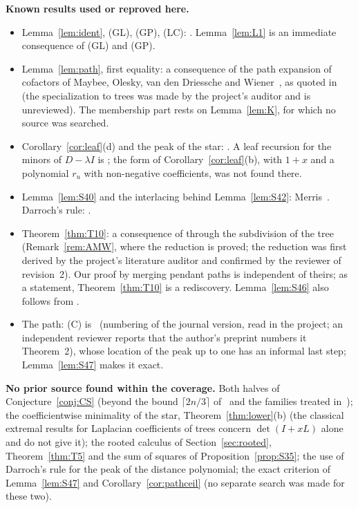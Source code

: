 \documentclass[11pt]{amsart}
\theoremstyle{definition}
\theoremstyle{remark}
\begin{document}
\smallskip
\noindent\textbf{Known results used or reproved here.}
\begin{itemize}
\item Lemma~\ref{lem:ident}, (GL), (GP), (LC): \cite{GL78,GP71,AAB}.
Lemma~\ref{lem:L1} is an immediate consequence of (GL) and (GP).
\item Lemma~\ref{lem:path}, first equality: a consequence of the path
expansion of cofactors of Maybee, Olesky, van den Driessche and
Wiener~\cite{MOvdDW}, as quoted in~\cite[eq.~(4)]{CS06} (the specialization to
trees was made by the project's auditor and is unreviewed). The membership
part rests on Lemma~\ref{lem:K}, for which no source was searched.
\item Corollary~\ref{cor:leaf}(d) and the peak of the star: \cite[Theorem~1]{Col89}.
A leaf recursion for the minors of $D-\lambda I$ is
\cite[Theorem~4]{Col86}; the form of Corollary~\ref{cor:leaf}(b), with
$1+x$ and a polynomial $r_u$ with non-negative coefficients, was not found
there.
\item Lemma~\ref{lem:S40} and the interlacing behind Lemma~\ref{lem:S42}:
Merris~\cite{Mer90}. Darroch's rule: \cite{Dar64,Pit97}.
\item Theorem~\ref{thm:T10}: a consequence of \cite[Theorem~4.4 with
Lemma~4.2]{AMW} through the subdivision of the tree (Remark~\ref{rem:AMW},
where the reduction is proved; the reduction was first derived by the
project's literature auditor and confirmed by the reviewer of revision~2).
Our proof by merging pendant paths is independent of theirs; as a statement,
Theorem~\ref{thm:T10} is a rediscovery. Lemma~\ref{lem:S46} also follows
from \cite[Lemma~4.2]{AMW}.
\item The path: (C) is~\cite[Theorem~3]{Col89} (numbering of the journal
version, read in the project; an independent reviewer reports that the
author's preprint numbers it Theorem~2), whose location of the peak up to one
has an informal last step; Lemma~\ref{lem:S47} makes it exact.
\end{itemize}

\noindent\textbf{No prior source found within the coverage.}
Both halves of Conjecture~\ref{conj:CS} (beyond the bound
$\lceil2n/3\rceil$ of~\cite{AAB} and the families treated in~\cite{Col89});
the coefficientwise minimality of the star, Theorem~\ref{thm:lower}(b) (the
classical extremal results for Laplacian coefficients of trees concern
$\det(I+xL)$ alone and do not give it); the rooted calculus of
Section~\ref{sec:rooted}, Theorem~\ref{thm:T5} and the sum of squares of
Proposition~\ref{prop:S35}; the use of Darroch's rule for the peak of the
distance polynomial; the exact criterion of Lemma~\ref{lem:S47} and
Corollary~\ref{cor:pathceil} (no separate search was made for these two).
\end{document}

